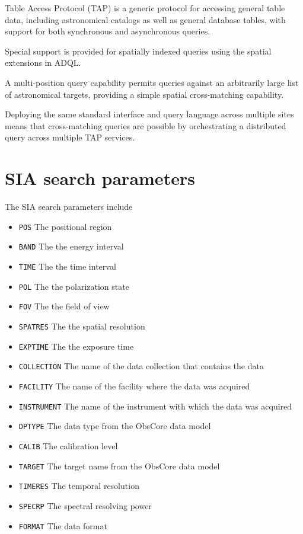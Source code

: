 \documentclass{article}
\begin{document}
Table Access Protocol (TAP) is a generic protocol for accessing general table
data, including astronomical catalogs as well as general database tables, with
support for both synchronous and asynchronous queries.

Special support is provided for spatially indexed queries using the spatial
extensions in ADQL.

A multi-position query capability permits queries against an arbitrarily large
list of astronomical targets, providing a simple spatial cross-matching
capability.

Deploying the same standard interface and query language across multiple sites
means that cross-matching queries are possible by orchestrating a distributed
query across multiple TAP services.

 
















\appendix
\section{SIA search parameters}
\noindent
The SIA search parameters include
\begin{itemize}
  \item \texttt{POS}  The positional region
  \item \texttt{BAND} The the energy interval
  \item \texttt{TIME} The the time interval
  \item \texttt{POL}  The the polarization state
  \item \texttt{FOV}  The the field of view
  \item \texttt{SPATRES} The the spatial resolution
  \item \texttt{EXPTIME} The the exposure time
  \item \texttt{COLLECTION} The name of the data collection that contains the data
  \item \texttt{FACILITY} The name of the facility where the data was acquired
  \item \texttt{INSTRUMENT} The name of the instrument with which the data was acquired
  \item \texttt{DPTYPE} The data type from the ObsCore
   data model
  \item \texttt{CALIB} The calibration level
  \item \texttt{TARGET} The target name from the ObsCore
   data model
  \item \texttt{TIMERES} The temporal resolution
  \item \texttt{SPECRP} The spectral resolving power
  \item \texttt{FORMAT} The data format
\end{itemize}



\theendnotes
\end{document}
